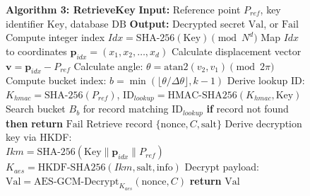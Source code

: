 \documentclass[conference,a4paper]{IEEEtran}
\begin{document}
\begin{figure}[!ht]
\centering
\begin{minipage}{\linewidth}
\begin{algorithmic}[1]
\STATE \textbf{Algorithm 3: RetrieveKey}
\STATE \textbf{Input:} Reference point $P_{ref}$, key identifier $\text{Key}$, database $\text{DB}$
\STATE \textbf{Output:} Decrypted secret $\text{Val}$, or $\text{Fail}$
\STATE Compute integer index $Idx = \text{SHA-256}(\text{Key}) \pmod{N^d}$
\STATE Map $Idx$ to coordinates $\mathbf{p}_{idx} = (x_1, x_2, \dots, x_d)$
\STATE Calculate displacement vector $\mathbf{v} = \mathbf{p}_{idx} - P_{ref}$
\STATE Calculate angle: $\theta = \text{atan2}(v_2, v_1) \pmod{2\pi}$
\STATE Compute bucket index: $b = \min(\lfloor \theta / \Delta\theta \rfloor, k - 1)$
\STATE Derive lookup ID: $K_{hmac} = \text{SHA-256}(P_{ref})$, $\text{ID}_{lookup} = \text{HMAC-SHA256}(K_{hmac}, \text{Key})$
\STATE Search bucket $B_b$ for record matching $\text{ID}_{lookup}$
\STATE \textbf{if} record not found \textbf{then} \textbf{return} $\text{Fail}$
\STATE Retrieve record $\{\text{nonce}, C, \text{salt}\}$
\STATE Derive decryption key via HKDF: \\
       $Ikm = \text{SHA-256}(\text{Key} \parallel \mathbf{p}_{idx} \parallel P_{ref})$ \\
       $K_{aes} = \text{HKDF-SHA256}(Ikm, \text{salt}, \text{info})$
\STATE Decrypt payload: $\text{Val} = \text{AES-GCM-Decrypt}_{K_{aes}}(\text{nonce}, C)$
\STATE \textbf{return} $\text{Val}$
\end{algorithmic}
\end{minipage}
\end{figure}
\end{document}
